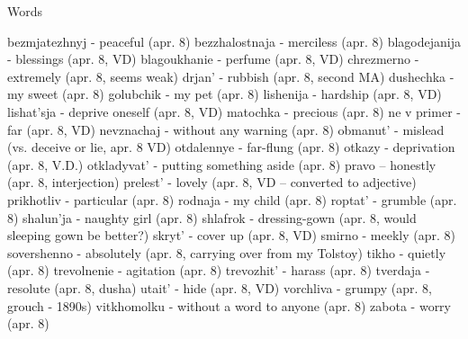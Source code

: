 Words

bezmjatezhnyj - peaceful (apr. 8)
bezzhalostnaja - merciless (apr. 8)
blagodejanija - blessings (apr. 8, VD)
blagoukhanie - perfume (apr. 8, VD)
chrezmerno - extremely (apr. 8, seems weak)
drjan' - rubbish (apr. 8, second MA)
dushechka - my sweet (apr. 8)
golubchik - my pet (apr. 8)
lishenija - hardship (apr. 8, VD)
lishat'sja - deprive oneself (apr. 8, VD)
matochka - precious (apr. 8)
ne v primer - far (apr. 8, VD)
nevznachaj - without any warning (apr. 8)
obmanut' - mislead (vs. deceive or lie, apr. 8 VD)
otdalennye - far-flung (apr. 8)
otkazy - deprivation (apr. 8, V.D.)
otkladyvat' - putting something aside (apr. 8)
pravo -- honestly (apr. 8, interjection)
prelest' - lovely (apr. 8, VD -- converted to adjective)
prikhotliv - particular (apr. 8)
rodnaja - my child (apr. 8)
roptat' - grumble (apr. 8)
shalun'ja - naughty girl (apr. 8)
shlafrok - dressing-gown (apr. 8, would sleeping gown be better?)
skryt' - cover up (apr. 8, VD)
smirno - meekly (apr. 8)
sovershenno - absolutely (apr. 8, carrying over from my Tolstoy)
tikho - quietly (apr. 8)
trevolnenie - agitation (apr. 8)
trevozhit' - harass (apr. 8)
tverdaja - resolute (apr. 8, dusha)
utait' - hide (apr. 8, VD)
vorchliva - grumpy (apr. 8, grouch - 1890s)
vitkhomolku - without a word to anyone (apr. 8)
zabota - worry (apr. 8)